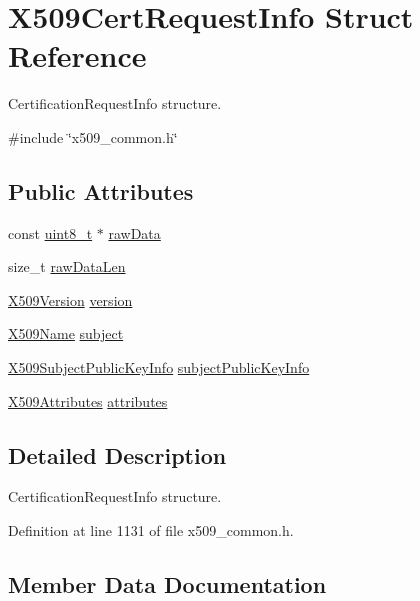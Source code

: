 \hypertarget{structX509CertRequestInfo}{}\section{X509\+Cert\+Request\+Info Struct Reference}
\label{structX509CertRequestInfo}


Certification\+Request\+Info structure.  




{\ttfamily \#include \char`\"{}x509\+\_\+common.\+h\char`\"{}}

\subsection*{Public Attributes}
\begin{DoxyCompactItemize}
\item 
const \hyperlink{stdint_8h_aba7bc1797add20fe3efdf37ced1182c5}{uint8\+\_\+t} $\ast$ \hyperlink{structX509CertRequestInfo_ad9090d83592df4b2e2ffe1a670fb0a65}{raw\+Data}
\item 
size\+\_\+t \hyperlink{structX509CertRequestInfo_a74cd4d14596bbf4331b6e05f02ad8e53}{raw\+Data\+Len}
\item 
\hyperlink{certificate_2x509__common_8h_a42c631650a1a4fbe9d70d54d99dcac26}{X509\+Version} \hyperlink{structX509CertRequestInfo_a6888747b5ea57fb90fdf9ae77a30c96d}{version}
\item 
\hyperlink{structX509Name}{X509\+Name} \hyperlink{structX509CertRequestInfo_ab7cab6a9a43f28a64198f227f2abae3f}{subject}
\item 
\hyperlink{structX509SubjectPublicKeyInfo}{X509\+Subject\+Public\+Key\+Info} \hyperlink{structX509CertRequestInfo_ab1c561b08bbbb942b684423343363e22}{subject\+Public\+Key\+Info}
\item 
\hyperlink{structX509Attributes}{X509\+Attributes} \hyperlink{structX509CertRequestInfo_ac4a74fdd56ba3feb52bb1a29de2c2e5c}{attributes}
\end{DoxyCompactItemize}


\subsection{Detailed Description}
Certification\+Request\+Info structure. 

Definition at line 1131 of file x509\+\_\+common.\+h.



\subsection{Member Data Documentation}
\mbox{\label{structX509CertRequestInfo_ac4a74fdd56ba3feb52bb1a29de2c2e5c}} 
